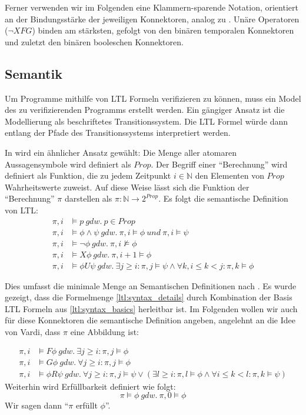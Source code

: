 Ferner verwenden wir im Folgenden eine Klammern-sparende Notation, orientiert an der Bindungsstärke der jeweiligen Konnektoren, analog zu \cite{huth+04}. Unäre Operatoren ($\lnot X F G$) binden am stärksten, gefolgt von den binären temporalen Konnektoren und zuletzt den binären booleschen Konnektoren.


\subsection{Semantik}

Um Programme mithilfe von LTL Formeln verifizieren zu können, muss ein Model des zu verifizierenden Programms erstellt werden. Ein gängiger Ansatz ist die Modellierung als beschriftetes Transitionssystem\cite{huth+04}. Die LTL Formel würde dann entlang der Pfade des Transitionssystems interpretiert werden. 

In \cite{vardi+96} wird ein ähnlicher Ansatz gewählt: Die Menge aller atomaren Aussagensymbole wird definiert als $Prop$. Der Begriff einer "`Berechnung"' wird definiert als Funktion, die zu jedem Zeitpunkt $i \in \mathbb{N}$ den Elementen von $Prop$ Wahrheitswerte zuweist. Auf diese Weise lässt sich die Funktion der "`Berechnung"' $\pi$ darstellen als $\pi : \mathbb{N} \rightarrow 2^{Prop}$. Es folgt die semantische Definition von LTL: 
\begin{equation*}
\begin{split}
    \pi, i &\models p\ gdw.\ p \in Prop\\
    \pi, i &\models \phi \land \psi\ gdw.\ \pi, i \models \phi\ und\ \pi, i \models \psi\\
    \pi, i &\models \lnot\phi\ gdw.\ \pi, i \not\models \phi\\
    \pi, i &\models X\phi\ gdw.\ \pi, i+1 \models \phi\\
    \pi, i &\models \phi U\psi\ gdw.\ \exists j \geq i: \pi, j \models \psi \land \forall k, i\leq k<j: \pi, k \models \phi
\end{split}
\end{equation*}

Dies umfasst die minimale Menge an Semantischen Definitionen nach \cite{vardi+96}. Es wurde gezeigt, dass die Formelmenge \ref{ltl:syntax_details} durch Kombination der Basis LTL Formeln aus \ref{ltl:syntax_basics} herleitbar ist. Im Folgenden wollen wir auch für diese Konnektoren die semantische Definition angeben, angelehnt an die Idee von Vardi, dass $\pi$ eine Abbildung ist:

\begin{equation*}
\begin{split}
    \pi, i &\models F\phi\ gdw.\ \exists j \geq i: \pi, j \models \phi\\
    \pi, i &\models G\phi \ gdw.\ \forall j \geq i: \pi, j \models \phi\\
    \pi, i &\models \phi R\psi\ gdw.\ \forall j \geq i: \pi, j \models \psi \lor (\exists l \geq i: \pi, l \models \phi \land \forall i \leq k < l: \pi, k \models \psi)
\end{split}
\end{equation*}
Weiterhin wird Erfüllbarkeit definiert wie folgt: 
\[
    \pi \models \phi\ gdw.\ \pi, 0 \models \phi
\]
Wir sagen dann "`$\pi$ erfüllt $\phi$"'.

